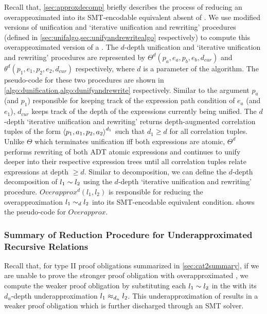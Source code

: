 Recall that, \cref{sec:approxdecomp} briefly describes the process of reducing an
overapproximated \recursiveRelation{} into its SMT-encodable equivalent absent
of \recursiveRelations{}.
We use modified versions of unification and `iterative unification and rewriting' procedures
(defined in \cref{sec:unifalgo,sec:unifyandrewritealgo} respectively)
to compute this overapproximated version of a \recursiveRelation{}.
The $d$-depth unification and `iterative unification and rewriting' procedures
are represented by $\Theta^{d}(p_a,e_a,p_b,e_b,d_{cur})$ and $\theta^{d}(p_1,e_1,p_2,e_2,d_{cur})$
respectively, where $d$ is a parameter of the algorithm.
The pseudo-code for these two procedures are shown in \cref{algo:dunification,algo:dunifyandrewrite} respectively.
Similar to the argument $p_a$ (and $p_1$) responsible for keeping track of the expression
path condition of $e_a$ (and $e_1$), $d_{cur}$ keeps track of the depth of the expressions
currently being unified.
The $d$-depth `iterative unification and rewriting' returns depth-augmented
correlation tuples of the form ${\langle p_1, a_1, p_2, a_2 \rangle}^{d_1}$ such that $d_1 \geq d$
for all correlation tuples.
Unlike $\Theta$ which terminates unification iff both expressions are atomic,
$\Theta^{d}$ performs rewriting of both ADT atomic expressions and continues to
unify deeper into their respective expression trees until all correlation tuples relate
expressions at depth $\geq d$.
Similar to decomposition, we can define the $d$-depth decomposition of $l_1 \sim{} l_2$
using the $d$-depth `iterative unification and rewriting' procedure.
$Overapprox^{d}(l_1,l_2)$ is responsible for reducing the overapproximation $l_1 \sim_{d} l_2$
into its SMT-encodable equivalent condition.
 shows the pseudo-code for $Overapprox$.





\subsubsection{Summary of Reduction Procedure for Underapproximated Recursive Relations}
\label{sec:underapproxalgo}
Recall that, for type II proof obligations summarized in \cref{sec:cat2summary},
if we are unable to prove the stronger proof obligation with overapproximated \lhs{},
we compute the weaker proof obligation by substituting each \recursiveRelation{} $l_1 \sim{} l_2$ in the \lhs{}
with its $d_u$-depth underapproximation $l_1 \approx_{d_u} l_2$.
This underapproximation of \lhs{} results in a weaker proof obligation which is further
discharged through an SMT solver.

